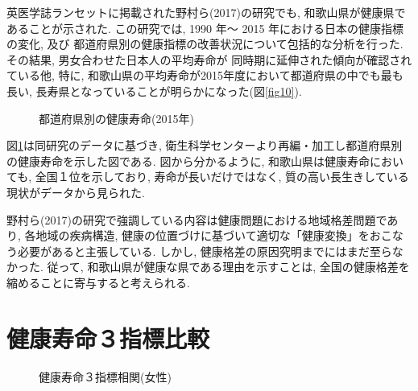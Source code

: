 英医学誌ランセットに掲載された野村ら(2017)の研究でも, 和歌山県が健康県であることが示された.
この研究では, 1990 年〜 2015 年における日本の健康指標の変化, 及び 都道府県別の健康指標の改善状況について包括的な分析を行った. その結果, 男女合わせた日本人の平均寿命が
同時期に延伸された傾向が確認されている他, 特に, 和歌山県の平均寿命が2015年度において都道府県の中でも最も長い, 長寿県となっていることが明らかになった(図\ref{fig10}).
%
%





\begin{figure}[h!]
	\begin{center}
		\caption{都道府県別の健康寿命(2015年)}\label{fig11}
	\end{center}
\end{figure}

図\ref{fig11}は同研究のデータに基づき, 衛生科学センターより再編・加工し都道府県別の健康寿命を示した図である. 図から分かるように, 和歌山県は健康寿命においても, 全国１位を示しており, 寿命が長いだけではなく, 質の高い長生きしている現状がデータから見られた.

野村ら(2017)の研究で強調している内容は健康問題における地域格差問題であり, 各地域の疾病構造, 健康の位置づけに基づいて適切な「健康変換」をおこなう必要があると主張している. しかし, 健康格差の原因究明までにはまだ至らなかった. 従って, 和歌山県が健康な県である理由を示すことは, 全国の健康格差を縮めることに寄与すると考えられる.

%

\section{健康寿命３指標比較}
\begin{figure}[h!]
	\begin{center}
		\caption{健康寿命３指標相関(女性)}
	\end{center}
\end{figure}

